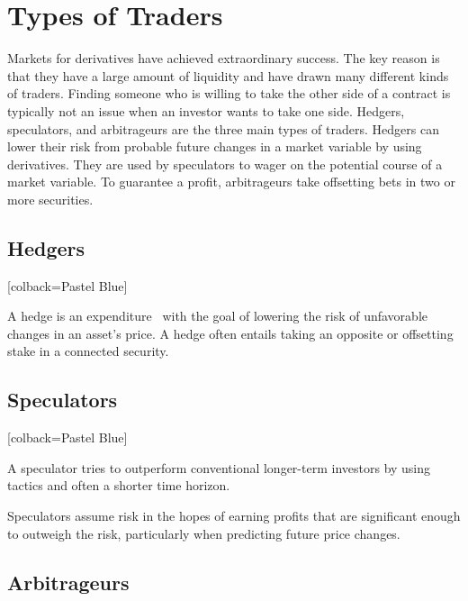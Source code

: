 \section{Types of Traders}
\noindent Markets for derivatives have achieved extraordinary success. The key reason is that they have a large amount of liquidity and have drawn many different kinds of traders.
Finding someone who is willing to take the other side of a contract is typically not an issue when an investor wants to take one side.
Hedgers, speculators, and arbitrageurs are the three main types of traders. Hedgers can lower their risk from probable future changes in a market variable by using derivatives. They are used by speculators to wager on the potential course of a market variable. To guarantee a profit, arbitrageurs take offsetting bets in two or more securities.
\subsection{Hedgers}

\begin{tcolorbox}
	[colback=Pastel Blue]
	\begin{definition}
		A hedge is an expenditure  with the goal of lowering the risk of unfavorable changes in an asset's price. A hedge often entails taking an opposite or offsetting stake in a connected security.
	\end{definition}
\end{tcolorbox}


\subsection{Speculators}

\begin{tcolorbox}
	[colback=Pastel Blue]
	\begin{definition}
		A speculator tries to outperform conventional longer-term investors by using tactics and often a shorter time horizon.
	\end{definition}
\end{tcolorbox}

\noindent Speculators assume risk in the hopes of earning profits that are significant enough to outweigh the risk, particularly when predicting future price changes.
\subsection{Arbitrageurs}

